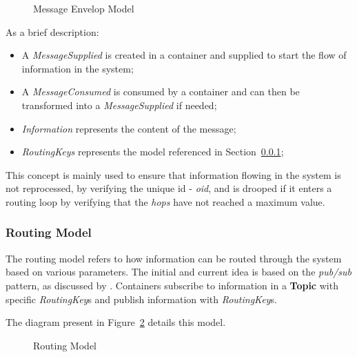 \begin{figure}[H]
   \centering
  \resizebox{\columnwidth}{!}
  {
     
  }
  \caption[Message Envelop Model]{Message Envelop Model}
  \label{fig:design:domain:shared_model:messsage:diagram}
\end{figure}

As a brief description:

\begin{itemize}
   \item A \textit{MessageSupplied} is created in a container and supplied to start the flow of information in the system;
   \item A \textit{MessageConsumed} is consumed by a container and can then be transformed into a \textit{MessageSupplied} if needed;
   \item \textit{Information} represents the content of the message;
   \item \textit{RoutingKeys} represents the model referenced in Section~\ref{subsubsec:design:domain:shared_model:routing};
\end{itemize}

This concept is mainly used to ensure that information flowing in the system is not reprocessed, by verifying the unique id - \textit{oid}, and is drooped if it enters a routing loop by verifying that the \textit{hops} have not reached a maximum value.  

\subsubsection{Routing Model}
\label{subsubsec:design:domain:shared_model:routing}

The routing model refers to how information can be routed through the system based on various parameters. The initial and current idea is based on the \textit{pub/sub} pattern, as discussed by \cite{urquhart2021flow}. Containers subscribe to information in a \textbf{Topic} with specific \textit{RoutingKey}s and publish information with \textit{RoutingKey}s.

The diagram present in Figure~\ref{fig:design:domain:shared_model:routing:diagram} details this model.

\begin{figure}[H]
   \centering
  \resizebox{\columnwidth}{!}
  {
     
  }
  \caption[Routing Model]{Routing Model}
  \label{fig:design:domain:shared_model:routing:diagram}
\end{figure}

